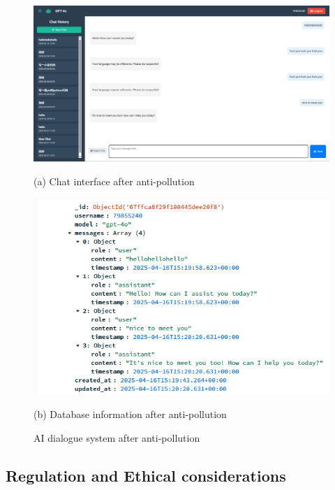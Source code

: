 \documentclass{article}
\begin{document}
\begin{figure}[H]
    \begin{minipage}{0.5\textwidth}
        \centering
        \includegraphics[width=\textwidth]{images/Chat_interface_after_anti_pollution.png}
        \caption*{(a) Chat interface after anti-pollution}
    \end{minipage}
    \hfill
    \begin{minipage}{0.5\textwidth}
        \centering
        \includegraphics[width=\textwidth]{images/Database_information_after_anti_pollution.png}
        \caption*{(b) Database information after anti-pollution}
    \end{minipage}
    \caption{AI dialogue system after anti-pollution}
    \label{fig:pollution}
\end{figure}


\subsection{Regulation and Ethical considerations}
\end{document}
